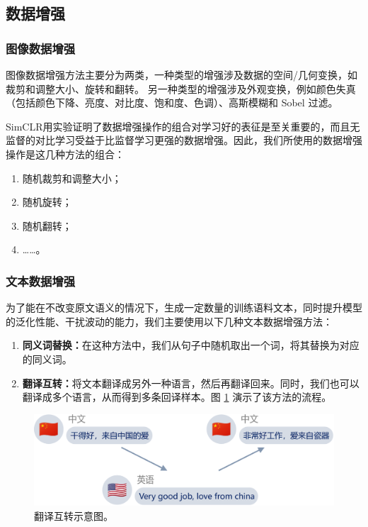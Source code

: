 \documentclass[a4paper]{zreport}
\begin{document}
\subsection{数据增强}


\subsubsection{图像数据增强}
图像数据增强方法主要分为两类，一种类型的增强涉及数据的空间/几何变换，如裁剪和调整大小、旋转和翻转。 另一种类型的增强涉及外观变换，例如颜色失真（包括颜色下降、亮度、对比度、饱和度、色调）、高斯模糊和 Sobel 过滤。

SimCLR用实验证明了数据增强操作的组合对学习好的表征是至关重要的，而且无监督的对比学习受益于比监督学习更强的数据增强。因此，我们所使用的数据增强操作是这几种方法的组合：
\begin{enumerate}
\item 随机裁剪和调整大小；
\item 随机旋转；
\item 随机翻转；
\item ……。
\end{enumerate}

\subsubsection{文本数据增强}

为了能在不改变原文语义的情况下，生成一定数量的训练语料文本，同时提升模型的泛化性能、干扰波动的能力，我们主要使用以下几种文本数据增强方法：

\begin{enumerate}
\item \textbf{同义词替换：}在这种方法中，我们从句子中随机取出一个词，将其替换为对应的同义词。
\item \textbf{翻译互转：}将文本翻译成另外一种语言，然后再翻译回来。同时，我们也可以翻译成多个语言，从而得到多条回译样本。图 \ref{fig:translate} 演示了该方法的流程。
\end{enumerate}

\begin{figure}[h]
\centering
\includegraphics[width=\linewidth]{figures/translate}
\caption{翻译互转示意图。}
\label{fig:translate}
\end{figure}
\end{document}
